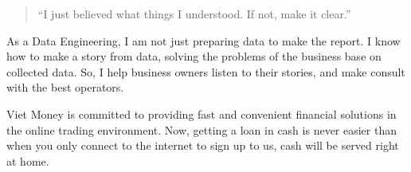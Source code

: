 \documentclass[10pt,a4paper,ragged2e,withhyper]{altacv}
\begin{document}
\begin{paracol}{2}
\bigskip

\begin{quote}
	``I just believed what things I understood. If not, make it clear.''
\end{quote}

\bigskip

\begin{minipage}{\linewidth}
\justifying
As a Data Engineering, I am not just preparing data to make the report. I know how to make a story from data, solving the problems of the business base on collected data. So, I help business owners listen to their stories, and make consult with the best operators. 
\end{minipage}

\smallskip



\begin{minipage}{\linewidth}
\justifying
Viet Money is committed to providing fast and convenient financial solutions in the online trading environment. Now, getting a loan in cash is never easier than when you only connect to the internet to sign up to us, cash will be served right at home.
\end{minipage}

\medskip


\end{paracol}
\end{document}
